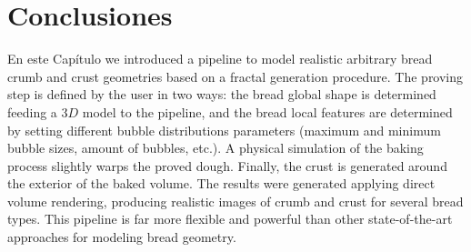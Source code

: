 \documentclass[spanish,a4paper,11pt,oneside,links]{report}
\begin{document}








\section{Conclusiones}
En este Cap\'itulo we introduced a pipeline to model realistic arbitrary bread crumb and crust geometries based on a fractal generation procedure.
The proving step is defined by the user in two ways: the bread global shape is determined feeding a $3D$ model to the pipeline, and the bread local features are determined by setting different bubble distributions parameters (maximum and minimum bubble sizes, amount of bubbles, etc.).
A physical simulation of the baking process slightly warps the proved dough.
Finally, the crust is generated around the exterior of the baked volume.
The results were generated applying direct volume rendering, producing realistic images of crumb and crust for several bread types.
This pipeline is far more flexible and powerful than other state-of-the-art approaches for modeling bread geometry.
\end{document}

